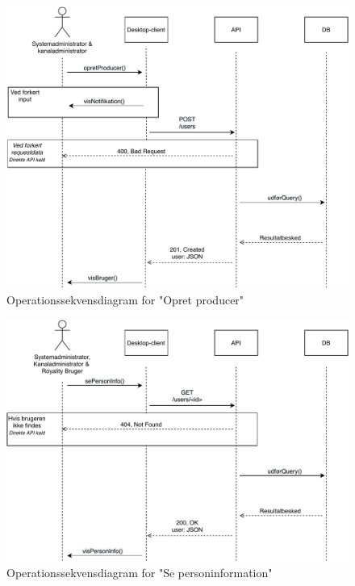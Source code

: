\begin{figure}[H]
\centering
\includegraphics[scale=0.7]{figures/Operationssekvensdiagrammer/opretProducer.pdf}
\caption{Operationssekvensdiagram for "Opret producer"}
\label{fig:op_create_producer}
\end{figure}

\begin{figure}[H]
\centering
\includegraphics[scale=0.7]{figures/Operationssekvensdiagrammer/sePersonInfo.pdf}
\caption{Operationssekvensdiagram for "Se personinformation"}
\label{fig:op_read_person_info}
\end{figure}